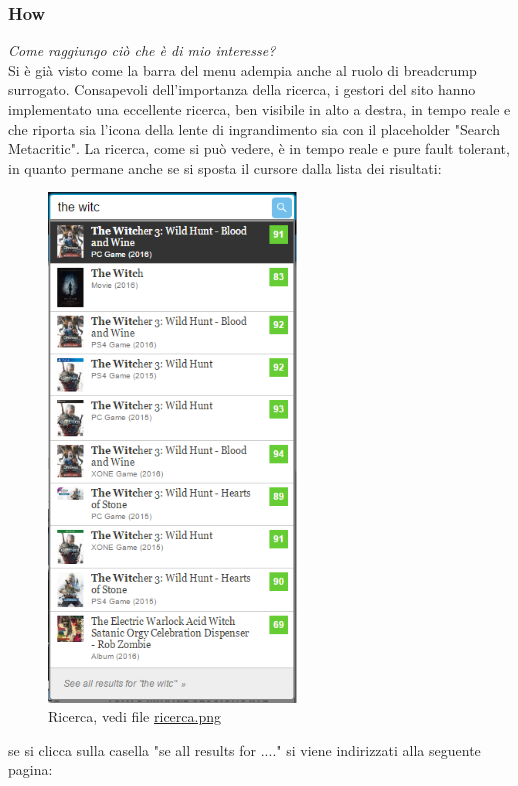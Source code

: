 \documentclass[12pt]{article}
\begin{document}
\subsubsection{How}
\textit{Come raggiungo ciò che è di mio interesse?}\\
Si è già visto come la barra del menu adempia anche al ruolo di breadcrump surrogato. Consapevoli dell'importanza della ricerca, i gestori del sito hanno implementato una eccellente ricerca, ben visibile in alto a destra, in tempo reale e che riporta sia l'icona della lente di ingrandimento sia con il placeholder "Search Metacritic". La ricerca, come si può vedere, è in tempo reale e pure fault tolerant, in quanto permane anche se si sposta il cursore dalla lista dei risultati:
\begin{figure}[H]
	\begin{center}
		\includegraphics[height=13.5cm]{ricerca.png}
		\caption{Ricerca, vedi file \href{ricerca.png}{ricerca.png}}
	\end{center}
\end{figure}
se si clicca sulla casella "se all results for ...." si viene indirizzati alla seguente pagina:
\end{document}
